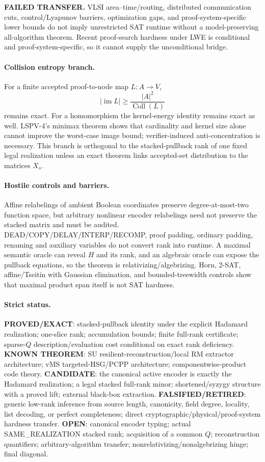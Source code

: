 \documentclass[11pt]{article}
\begin{document}
\textbf{FAILED TRANSFER.}
VLSI area--time/routing, distributed communication cuts, control/Lyapunov barriers, optimization gaps, and proof-system-specific lower bounds do not imply unrestricted SAT runtime without a model-preserving all-algorithm theorem. Recent proof-search hardness under LWE is conditional and proof-system-specific, so it cannot supply the unconditional bridge.

\paragraph{Collision entropy branch.}
For a finite accepted proof-to-node map \(L:A\to V\),
\[
|\operatorname{im}L|\ge \frac{|A|^2}{\operatorname{Coll}(L)}
\]
remains exact. For a homomorphism the kernel-energy identity remains exact as well. LSPV-4's minimax theorem shows that cardinality and kernel size alone cannot improve the worst-case image bound; verifier-induced anti-concentration is necessary. This branch is orthogonal to the stacked-pullback rank of one fixed legal realization unless an exact theorem links accepted-set distribution to the matrices \(X_s\).

\paragraph{Hostile controls and barriers.}
Affine relabelings of ambient Boolean coordinates preserve degree-at-most-two function space, but arbitrary nonlinear encoder relabelings need not preserve the stacked matrix and must be audited. DEAD/COPY/DELAY/INTERP/RECOMP, proof padding, ordinary padding, renaming and auxiliary variables do not convert rank into runtime. A maximal semantic oracle can reveal \(H\) and its rank, and an algebraic oracle can expose the pullback equations, so the theorem is relativizing/algebrizing. Horn, 2-SAT, affine/Tseitin with Gaussian elimination, and bounded-treewidth controls show that maximal product span itself is not SAT hardness.

\paragraph{Strict status.}
\textbf{PROVED/EXACT}: stacked-pullback identity under the explicit Hadamard realization; one-slice rank; accumulation bounds; finite full-rank certificate; sparse-\(Q\) description/evaluation cost conditional on exact rank deficiency.
\textbf{KNOWN THEOREM}: SU resilient-reconstruction/local RM extractor architecture; vMS targeted-HSG/PCPP architecture; componentwise-product code theory.
\textbf{CANDIDATE}: the canonical active encoder is exactly the Hadamard realization; a legal stacked full-rank minor; shortened/syzygy structure with a proved lift; external black-box extraction.
\textbf{FALSIFIED/RETIRED}: generic low-rank inference from source length, canonicity, field degree, locality, list decoding, or perfect completeness; direct cryptographic/physical/proof-system hardness transfer.
\textbf{OPEN}: canonical encoder typing; actual SAME\_REALIZATION stacked rank; acquisition of a common \(Q\); reconstruction quantifiers; arbitrary-algorithm transfer; nonrelativizing/nonalgebrizing hinge; final diagonal.
\end{document}
